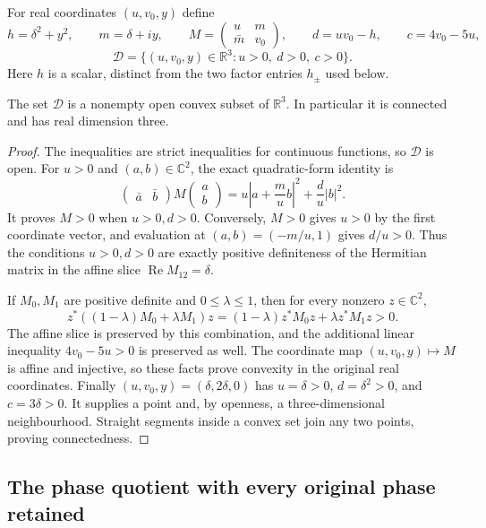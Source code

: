 For real coordinates $(u,v_0,y)$ define
\[
 h=\delta^2+y^2,\qquad m=\delta+iy,\qquad
 M=\begin{pmatrix}u&m\\\bar m&v_0\end{pmatrix},\qquad
 d=uv_0-h,\qquad c=4v_0-5u,
\]
\[
 \mathcal D=\{(u,v_0,y)\in\mathbb R^3:u>0,\ d>0,\ c>0\}.
\]
Here $h$ is a scalar, distinct from the two factor entries
$h_\pm$ used below.

\begin{lemma}
\label{sgd:smooth-addon:convex}
The set $\mathcal D$ is a nonempty open convex subset of
$\mathbb R^3$. In particular it is connected and has real dimension three.
\end{lemma}
\begin{proof}
The inequalities are strict inequalities for continuous functions,
so $\mathcal D$ is open. For $u>0$ and $(a,b)\in\mathbb C^2$,
the exact quadratic-form identity is
\[
 \begin{pmatrix}\bar a&\bar b\end{pmatrix}
 M\begin{pmatrix}a\\b\end{pmatrix}
 =u\left|a+\frac m u b\right|^2+\frac d u|b|^2.
\]
It proves $M>0$ when $u>0,d>0$. Conversely, $M>0$ gives
$u>0$ by the first coordinate vector, and evaluation at
$(a,b)=(-m/u,1)$ gives $d/u>0$.
Thus the conditions $u>0,d>0$ are exactly positive definiteness
of the Hermitian matrix in the affine slice $\operatorname{Re}M_{12}=\delta$.

If $M_0,M_1$ are positive definite and $0\le\lambda\le1$,
then for every nonzero $z\in\mathbb C^2$,
\[
 z^*((1-\lambda)M_0+\lambda M_1)z
 =(1-\lambda)z^*M_0z+\lambda z^*M_1z>0.
\]
The affine slice is preserved by this combination, and the additional
linear inequality $4v_0-5u>0$ is preserved as well.
The coordinate map $(u,v_0,y)\mapsto M$ is affine and injective,
so these facts prove convexity in the original real coordinates.
Finally $(u,v_0,y)=(\delta,2\delta,0)$ has
$u=\delta>0$, $d=\delta^2>0$, and $c=3\delta>0$.
It supplies a point and, by openness, a three-dimensional neighbourhood.
Straight segments inside a convex set join any two points,
proving connectedness.
\end{proof}

\subsection{The phase quotient with every original phase retained}

